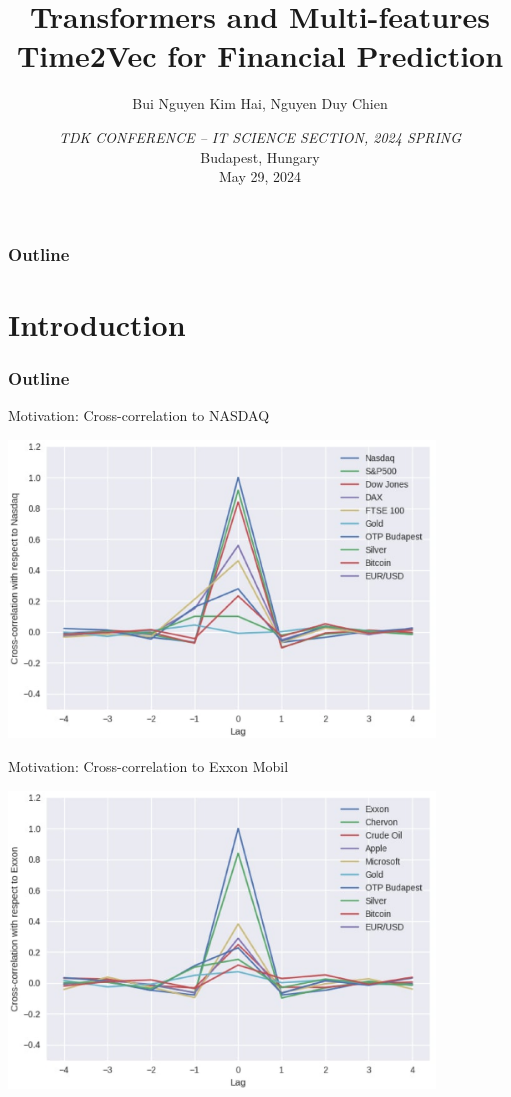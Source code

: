 \documentclass[compress, mathserif, fleqn, 10pt]{beamer}
\title{Transformers and Multi-features Time2Vec for Financial Prediction}
\author[Bui Nguyen Kim Hai, Nguyen Duy Chien]{Bui Nguyen Kim Hai, Nguyen Duy Chien}
\date{\scriptsize \emph{TDK CONFERENCE – IT SCIENCE SECTION, 2024 SPRING}\\
	\bigskip
	Budapest, Hungary\\ May 29, 2024}
\begin{document}
	\abovedisplayskip=1pt \belowdisplayskip=2pt \abovedisplayshortskip=1pt \belowdisplayshortskip=2pt
	
	\begin{frame}
		\titlepage
	\end{frame}
	
	\begin{frame}
		\frametitle{Outline}
		\tableofcontents
	\end{frame}
	
	\section{Introduction}
	\begin{frame}
		\frametitle{Outline}
		\tableofcontents[currentsection]
	\end{frame}
	
	\begin{frame}{Motivation: Cross-correlation to NASDAQ}
		\centerline{\includegraphics[width=0.85\textwidth]{images/nas_base.eps}}
	\end{frame}
	
	\begin{frame}{Motivation: Cross-correlation to Exxon Mobil}
		\centerline{\includegraphics[width=0.85\textwidth]{images/exx_base.eps}}
	\end{frame}
	
\end{document}
